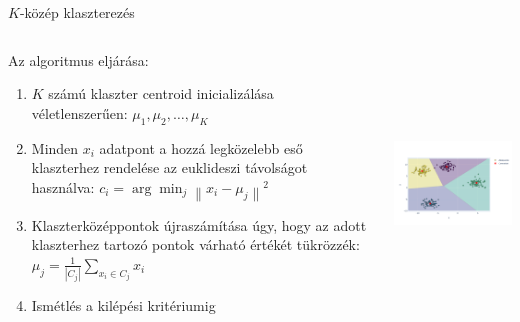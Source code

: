 \documentclass[english, aspectratio=169]{beamer}
\begin{document}
	\begin{frame}{$K$-közép klaszterezés}
		\begin{columns}
			\begin{column}{.5\textwidth}
				Az algoritmus eljárása:
				\begin{enumerate}
					\item $K$ számú klaszter centroid inicializálása véletlenszerűen: $\mu_1, \mu_2, \ldots, \mu_K$
					\item Minden $x_i$ adatpont a hozzá legközelebb eső klaszterhez rendelése az euklideszi távolságot használva: $c_i = \arg\min_{j} \left\| x_i - \mu_j \right\|^2$
					\item Klaszterközéppontok újraszámítása úgy, hogy az adott klaszterhez tartozó pontok várható értékét tükrözzék: $\mu_j = \frac{1}{|C_j|} \sum_{x_i \in C_j} x_i$
					\item Ismétlés a kilépési kritériumig
				\end{enumerate}
			\end{column}
			\begin{column}{.5\textwidth}
				\begin{center}
					\includegraphics[width=7cm, height=7cm, keepaspectratio]{images/freq_14.png}
				\end{center}
			\end{column}
		\end{columns}
	\end{frame}
	
\end{document}
